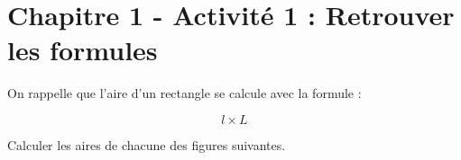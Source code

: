 \section*{Chapitre 1 - Activité 1 : Retrouver les formules}

On rappelle que l'aire d'un rectangle se calcule avec la formule :

    {\begin{figure}[H]
        \centering
        $$l\times L$$
    \end{figure}}

\cnt Calculer les aires de chacune des figures suivantes.

